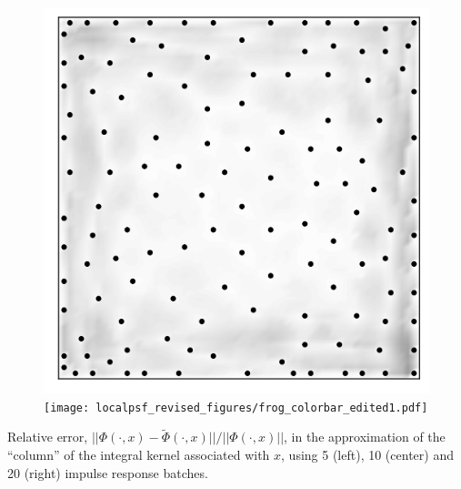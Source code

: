 \documentclass[10pt,final,xcolor=dvipsnames]{beamer}
\begin{document}
\begin{frame}
\begin{figure}
    \hfill
    \includegraphics[scale=0.35]{localpsf_revised_figures/frog_column_errors_psf20.png}
    \hfill
    \texttt{[image: localpsf\_revised\_figures/frog\_colorbar\_edited1.pdf]}
  \end{figure}

  \begin{center}
    Relative error, $||\Phi(\cdot,x) -
      \widetilde{\Phi}(\cdot,x)||/||\Phi(\cdot,x)||$, in the
      approximation of the ``column'' of the integral kernel
      associated with $x$, using 5 (left), 10 (center) and 20
      (right) impulse response batches.
  \end{center}
\end{frame}
\end{document}
